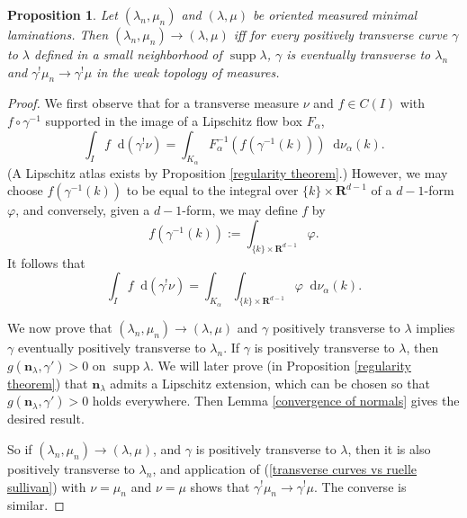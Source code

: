 \documentclass[reqno,11pt]{amsart}
\newcommand{\RR}{\mathbf{R}}
\newcommand*\dif{\mathop{}\!\mathrm{d}}
\DeclareMathOperator{\supp}{supp}
\newcommand{\normal}{\mathbf n}
\newtheorem{proposition}[theorem]{Proposition}
\theoremstyle{definition}
\numberwithin{equation}{section}
\begin{document}
\begin{proposition}\label{characterization of measure convergence}
	Let $(\lambda_n, \mu_n)$ and $(\lambda, \mu)$ be oriented measured minimal laminations. Then $(\lambda_n, \mu_n) \to (\lambda, \mu)$ iff for every positively transverse curve $\gamma$ to $\lambda$ defined in a small neighborhood of $\supp \lambda$, $\gamma$ is eventually transverse to $\lambda_n$ and $\gamma^! \mu_n \to \gamma^! \mu$ in the weak topology of measures.
\end{proposition}
\begin{proof}
	We first observe that for a transverse measure $\nu$ and $f \in C(I)$ with $f \circ \gamma^{-1}$ supported in the image of a Lipschitz flow box $F_\alpha$,
	$$\int_I f \dif(\gamma^! \nu) = \int_{K_\alpha} F_\alpha^{-1}(f(\gamma^{-1}(k))) \dif \nu_\alpha(k).$$
	(A Lipschitz atlas exists by Proposition \ref{regularity theorem}.)
	However, we may choose $f(\gamma^{-1}(k))$ to be equal to the integral over $\{k\} \times \RR^{d - 1}$ of a $d-1$-form $\varphi$, and conversely, given a $d-1$-form, we may define $f$ by
	$$f(\gamma^{-1}(k)) := \int_{\{k\} \times \RR^{d - 1}} \varphi.$$
	It follows that
\begin{equation}\label{transverse curves vs ruelle sullivan}
	\int_I f \dif(\gamma^! \nu) = \int_{K_\alpha} \int_{\{k\} \times \RR^{d - 1}} \varphi \dif \nu_\alpha(k).
\end{equation}

	We now prove that $(\lambda_n, \mu_n) \to (\lambda, \mu)$ and $\gamma$ positively transverse to $\lambda$ implies $\gamma$ eventually positively transverse to $\lambda_n$.
	If $\gamma$ is positively transverse to $\lambda$, then $g(\normal_\lambda, \gamma') > 0$ on $\supp \lambda$.
	We will later prove (in Proposition \ref{regularity theorem}) that $\normal_\lambda$ admits a Lipschitz extension, which can be chosen so that $g(\normal_\lambda, \gamma') > 0$ holds everywhere.
	Then Lemma \ref{convergence of normals} gives the desired result.

	So if $(\lambda_n, \mu_n) \to (\lambda, \mu)$, and $\gamma$ is positively transverse to $\lambda$, then it is also positively transverse to $\lambda_n$, and application of (\ref{transverse curves vs ruelle sullivan}) with $\nu = \mu_n$ and $\nu = \mu$ shows that $\gamma^! \mu_n \to \gamma^! \mu$.
	The converse is similar.
\end{proof}


\printbibliography
\end{document}
